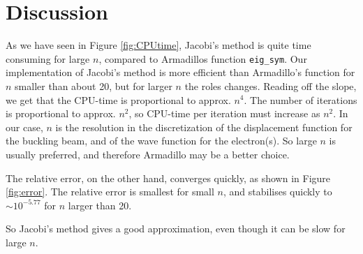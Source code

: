 \section{Discussion}
\label{sec:discussion}

As we have seen in Figure \ref{fig:CPUtime}, Jacobi's method is quite time consuming for large $n$, compared to Armadillos function \texttt{eig\_sym}.  Our implementation of Jacobi's method is more efficient than Armadillo's function for $n$ smaller than about 20, but for larger $n$ the roles changes. Reading off the slope, we get that the CPU-time is proportional to approx. $n^4$. The number of iterations is proportional to approx. $n^2$, so CPU-time per iteration must increase as $n^2$. In our case, $n$ is the resolution in the discretization of the displacement function for the buckling beam, and of the wave function for the electron(s). So large $n$ is usually preferred, and therefore Armadillo may be a better choice. 

The relative error, on the other hand, converges quickly, as shown in Figure \ref{fig:error}. The relative error is smallest for small $n$, and stabilises quickly to $\sim10^{-5.77}$ for $n$ larger than 20. 

So Jacobi's method gives a good approximation, even though it can be slow for large $n$. 